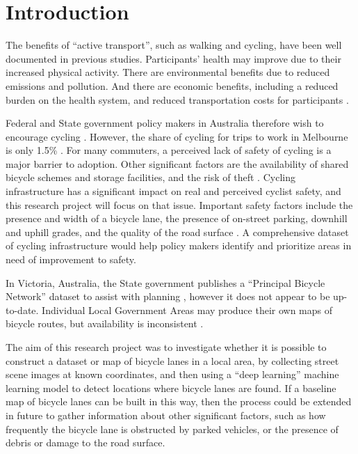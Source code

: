 \documentclass[11pt,twoside]{report}
\begin{document}

\tableofcontents
\listoffigures
\listoftables


\chapter{Introduction}


The benefits of ``active transport'', such as walking and cycling, have been well documented in previous studies.  Participants' health may improve due to their increased physical activity.  There are environmental benefits due to reduced emissions and pollution.  And there are economic benefits, including a reduced burden on the health system, and reduced transportation costs for participants \cite{LEE2012219} \cite{RABL2012121}.

Federal and State government policy makers in Australia therefore wish to encourage cycling \cite{federal_policy_2019} \cite{state_policy_2020}.  However, the share of cycling for trips to work in Melbourne is only 1.5\% \cite{melbactive}.  For many commuters, a perceived lack of safety of cycling is a major barrier to adoption.  Other significant factors are the availability of shared bicycle schemes and storage facilities, and the risk of theft \cite{WILSON2018234}.  Cycling infrastructure has a significant impact on real and perceived cyclist safety, and this research project will focus on that issue.  Important safety factors include the presence and width of a bicycle lane, the presence of on-street parking, downhill and uphill grades, and the quality of the road surface \cite{BIKESAFETY} \cite{Teschke2012}.  A comprehensive dataset of cycling infrastructure would help policy makers identify and prioritize areas in need of improvement to safety.

In Victoria, Australia, the State government publishes a ``Principal Bicycle Network'' dataset to assist with planning \cite{PrincipalBicycleNetwork}, however it does not appear to be up-to-date.  Individual Local Government Areas may produce their own maps of bicycle routes, but availability is inconsistent \cite{vicroads_maps}.

The aim of this research project was to investigate whether it is possible to construct a dataset or map of bicycle lanes in a local area, by collecting street scene images at known coordinates, and then using a ``deep learning'' machine learning model to detect locations where bicycle lanes are found.  If a baseline map of bicycle lanes can be built in this way, then the process could be extended in future to gather information about other significant factors, such as how frequently the bicycle lane is obstructed by parked vehicles, or the presence of debris or damage to the road surface.
\end{document}
